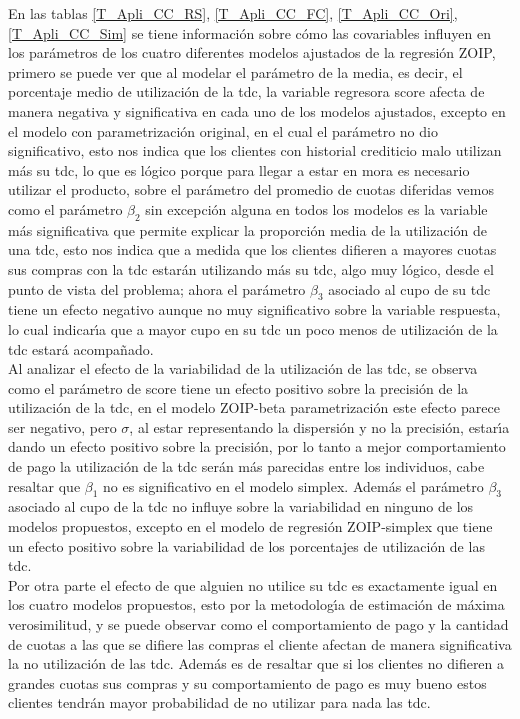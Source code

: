 En las tablas \ref{T_Apli_CC_RS}, \ref{T_Apli_CC_FC}, \ref{T_Apli_CC_Ori}, \ref{T_Apli_CC_Sim} se tiene informaci\'{o}n sobre c\'{o}mo las covariables influyen en los par\'{a}metros de los cuatro diferentes modelos ajustados de la regresi\'{o}n ZOIP, primero se puede ver que al modelar el par\'{a}metro de la media, es decir, el porcentaje medio de utilizaci\'{o}n de la tdc, la variable regresora score afecta de manera negativa y significativa en cada uno de los modelos ajustados, excepto en el mo\-de\-lo con parametrizaci\'{o}n original, en el cual el par\'{a}metro no dio significativo, esto nos indica que los clientes con historial crediticio malo utilizan m\'{a}s su tdc, lo que es l\'{o}gico porque para llegar a estar en mora es necesario utilizar el producto, sobre el par\'{a}metro del promedio de cuotas diferidas vemos como el par\'{a}metro $\beta_2$ sin excepci\'{o}n alguna en todos los modelos es la variable m\'{a}s significativa que permite explicar la proporci\'{o}n media de la utilizaci\'{o}n de una tdc, esto nos indica que a medida que los clientes difieren a mayores cuotas sus compras con la tdc estar\'{a}n utilizando m\'{a}s su tdc, algo muy l\'{o}gico, desde el punto de vista del problema; ahora el par\'{a}metro $\beta_3$ asociado al cupo de su tdc tiene un efecto negativo aunque no muy significativo sobre la variable respuesta, lo cual indicar\'{\i}a que a mayor cupo en su tdc un poco menos de utilizaci\'{o}n de la tdc estar\'{a} acompa\~{n}ado.\\

Al analizar el efecto de la variabilidad de la utilizaci\'{o}n de las tdc, se observa como el par\'{a}metro de score tiene un efecto positivo sobre la precisi\'{o}n de la utilizaci\'{o}n de la tdc, en el modelo ZOIP-beta parametrizaci\'{o}n \cite{Stasinopoulos2} este efecto parece ser negativo, pero $\sigma$, al estar representando la dispersi\'{o}n y no la precisi\'{o}n, estar\'{\i}a dando un efecto positivo sobre la precisi\'{o}n, por lo tanto a mejor comportamiento de pago la utilizaci\'{o}n de la tdc ser\'{a}n m\'{a}s parecidas entre los individuos, cabe resaltar que $\beta_1$ no es significativo en el modelo simplex. Adem\'{a}s el par\'{a}metro $\beta_3$ asociado al cupo de la tdc no influye sobre la variabilidad en ninguno de los modelos propuestos, excepto en el modelo de regresi\'{o}n ZOIP-simplex que tiene un efecto positivo sobre la variabilidad de los porcentajes de utilizaci\'{o}n de las tdc.\\

Por otra parte el efecto de que alguien no utilice su tdc es exactamente igual en los cuatro modelos propuestos, esto por la metodolog\'{\i}a de estimaci\'{o}n de m\'{a}xima verosimilitud, y se puede observar como el comportamiento de pago y la cantidad de cuotas a las que se difiere las compras el cliente afectan de manera significativa la no utilizaci\'{o}n de las tdc. Adem\'{a}s es de resaltar que si los clientes no difieren a grandes cuotas sus compras y su comportamiento de pago es muy bueno estos clientes tendr\'{a}n mayor probabilidad de no utilizar para nada las tdc.\\

